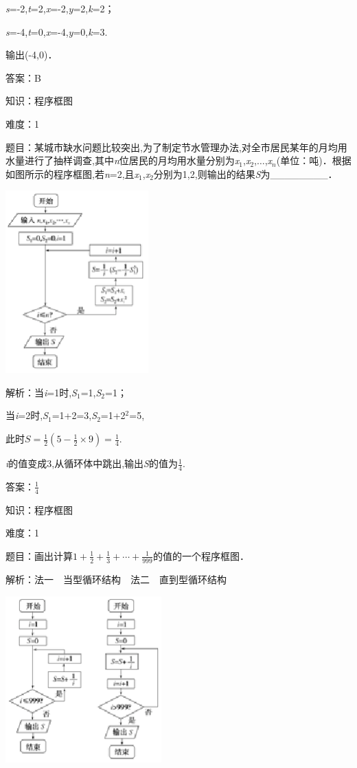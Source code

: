 \documentclass{article} %
\begin{document}
\textit{s}=-2,\textit{t}=2,\textit{x}=-2,\textit{y}=2,\textit{k}=2；

\textit{s}=-4,\textit{t}=0,\textit{x}=-4,\textit{y}=0,\textit{k}=3.

输出(-4,0)．

答案：B

知识：程序框图

难度：1

题目：某城市缺水问题比较突出,为了制定节水管理办法,对全市居民某年的月均用水量进行了抽样调查,其中\textit{n}位居民的月均用水量分别为\textit{x}${}_{1}$,\textit{x}${}_{2}$,$\dots$,\textit{x${}_{n}$}(单位：吨)．根据如图所示的程序框图,若\textit{n}=2,且\textit{x}${}_{1}$,\textit{x}${}_{2}$分别为1,2,则输出的结果\textit{S}为\_\_\_\_\_\_\_\_．

\includegraphics*[width=2.17in, height=2.77in, keepaspectratio=false]{image25}

解析：当\textit{i}=1时,\textit{S}${}_{1}$=1,\textit{S}${}_{2}$=1；

当\textit{i}=2时,\textit{S}${}_{1}$=1+2=3,\textit{S}${}_{2}$=1+2${}^{2}$=5,

此时$S=\frac{1}{2}(5-\frac{1}{2}\times9)=\frac{1}{4}$.

\textit{i}的值变成3,从循环体中跳出,输出\textit{S}的值为$\frac{1}{4}$.

答案：$\frac{1}{4}$

知识：程序框图

难度：1

题目：画出计算$1+\frac{1}{2}+\frac{1}{3}+\cdots+\frac{1}{999}$的值的一个程序框图．

解析：法一　当型循环结构　法二　直到型循环结构

\includegraphics*[width=2.36in, height=2.53in, keepaspectratio=false]{image26}
\end{document}
